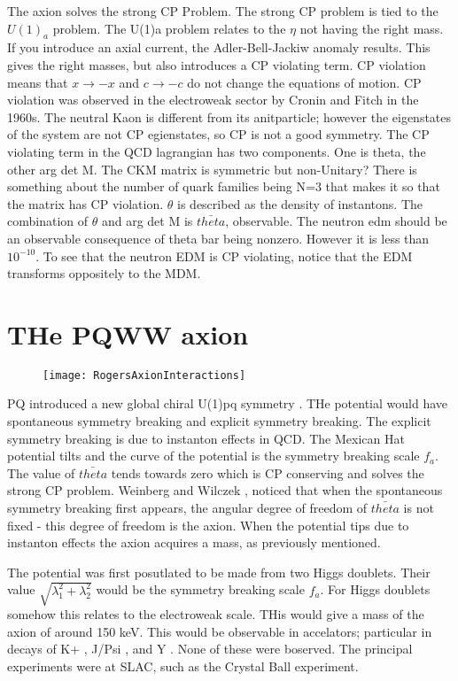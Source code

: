 \documentclass[11pt]{book}
\begin{document}
The axion solves the strong CP Problem.
The strong CP problem is tied to the $U(1)_a$ problem.
The U(1)a problem relates to the $\eta$ not having the right mass.
If you introduce an axial current, the Adler-Bell-Jackiw anomaly results.
This gives the right masses, but also introduces a CP violating term.
CP violation means that $x \rightarrow -x$ and $c \rightarrow -c$ do not change the equations of motion.
CP violation was observed in the electroweak sector by Cronin and Fitch in the 1960s. The neutral Kaon is different from its anitparticle; however the eigenstates of the system are not CP egienstates, so CP is not a good symmetry.
The CP violating term in the QCD lagrangian has two components. One is theta, the other arg det M. The CKM matrix is symmetric but non-Unitary? There is something about the number of quark families being N=3 that makes it so that the matrix has CP violation.
$\theta$ is described as the density of instantons.
The combination of $\theta$ and arg det M is $\bar{theta}$, observable.
The neutron edm should be an observable consequence of theta bar being nonzero.
However it is less than $10^{-10}$.
To see that the neutron EDM is CP violating, notice that the EDM transforms oppositely to the MDM. 

\section{THe PQWW axion}

\begin{figure}
\texttt{[image: RogersAxionInteractions]}
\end{figure}

PQ introduced a new global chiral U(1)pq symmetry \cite{pecceiquinn}. THe potential would have spontaneous symmetry breaking and explicit symmetry breaking. The explicit symmetry breaking is due to instanton effects in QCD. The Mexican Hat potential tilts and the curve of the potential is the symmetry breaking scale $f_a$. The value of $\bar{theta}$ tends towards zero which is CP conserving and solves the strong CP problem. Weinberg and Wilczek \cite{weinberg},\cite{wilczek} noticed that when the spontaneous symmetry breaking first appears, the angular degree of freedom of $\bar{theta}$ is not fixed - this degree of freedom is the axion. When the potential tips due to instanton effects the axion acquires a mass, as previously mentioned.

The potential was first posutlated to be made from two Higgs doublets. Their value $\sqrt{\lambda_1^2 + \lambda_2^2 }$ would be the symmetry breaking scale $f_a$. For Higgs doublets somehow this relates to the electroweak scale. THis would give a mass of the axion of around 150 keV. This would be observable in accelators; particular in decays of K+ \cite{kdecays}, J/Psi \cite{jpsidecays}, and Y \cite{upsilondecays}. None of these were boserved. The principal experiments were at SLAC, such as the Crystal Ball experiment.
\end{document}
